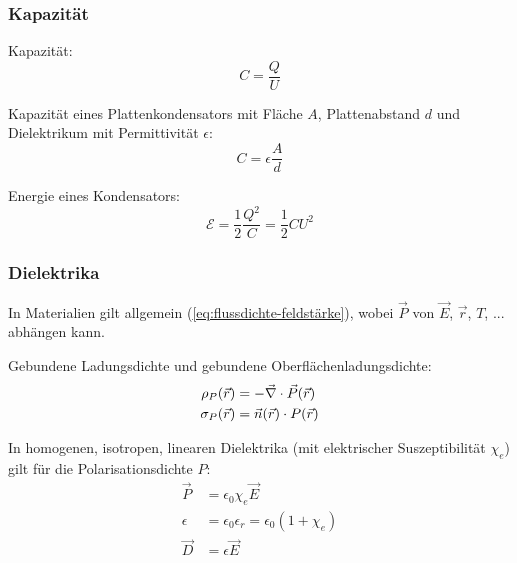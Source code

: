 \documentclass[11pt]{article}
\numberwithin{equation}{section}
\begin{document}
			\subsubsection{Kapazität}
				\noindent
				Kapazität:
				\begin{equation}
					C=\frac{Q}{U}
				\end{equation}

				\noindent
				Kapazität eines Plattenkondensators mit Fläche $A$, Plattenabstand $d$ und Dielektrikum mit Permittivität $\epsilon$:
				\begin{equation}
					C=\epsilon \frac{A}{d}
				\end{equation}

				\noindent
				Energie eines Kondensators:
				\begin{equation}
					\mathcal{E} = \frac{1}{2}\frac{Q^2}{C} = \frac{1}{2}CU^2
				\end{equation}

			\subsubsection{Dielektrika}
				\noindent
				In Materialien gilt allgemein (\ref{eq:flussdichte-feldstärke}), wobei $\vec{P}$ von $\vec{E}$, $\vec{r}$, $T$, ... abhängen kann. \vspace{10pt}

				\noindent
				Gebundene Ladungsdichte und gebundene Oberflächenladungsdichte:
				\begin{equation}
					\begin{aligned}
						\rho_P(\vec{r}) &= -\vec{\nabla} \cdot\vec{P}(\vec{r}) \\
						\sigma_P(\vec{r}) &= \vec{n}(\vec{r})\cdot P(\vec{r})
					\end{aligned}
				\end{equation}

				\noindent
				In homogenen, isotropen, linearen Dielektrika (mit elektrischer Suszeptibilität $\chi_e$) gilt für die Polarisationsdichte $P$:
				\begin{equation}
					\begin{aligned}
						\vec{P} &= \epsilon_0 \chi_e \vec{E} \\
						\epsilon &= \epsilon_0 \epsilon_r = \epsilon_0(1+\chi_e) \\
						\vec{D} &= \epsilon \vec{E} \\
					\end{aligned}
				\end{equation}
\end{document}
